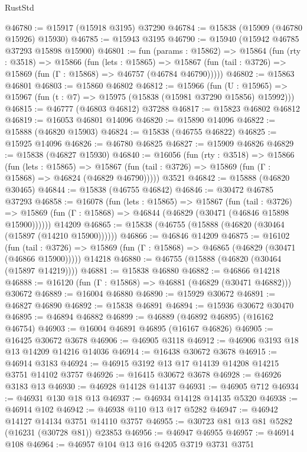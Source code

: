 \begin{lexlean}{RustStd}
\begin{coremodule}
@46780 := @15917 (@15918 @3195) @37290
@46784 := @15838 (@15909 (@46780 @15926) @15930)
@46785 := @15943 @3195
@46790 := @15940 (@15942 @46785 @37293 @15898 @15900)
@46801 := fun (params : @15862) =>
  @15864
    (fun (rty : @3518) =>
    @15866
      (fun (lets : @15865) =>
      @15867 (fun (tail : @3726) => @15869 (fun (Γ : @15868) => @46757 (@46784 @46790)))))
@46802 := @15863 @46801
@46803 := @15860 @46802
@46812 := @15966
    (fun (U : @15965) => @15967 (fun (t : @7) => @15975 (@15838 (@15981 @37290 @15856) @15992)))
@46815 := @46777 (@46803 @46812) @37288
@46817 := @15823 @46802 @46812
@46819 := @16053 @46801 @14096
@46820 := @15890 @14096
@46822 := @15888 (@46820 @15903)
@46824 := @15838 (@46755 @46822)
@46825 := @15925 @14096
@46826 := @46780 @46825
@46827 := @15909 @46826
@46829 := @15838 (@46827 @15930)
@46840 := @16056
    (fun (rty : @3518) =>
    @15866
      (fun (lets : @15865) =>
      @15867 (fun (tail : @3726) => @15869 (fun (Γ : @15868) => @46824 (@46829 @46790)))))
    @3521
@46842 := @15888 (@46820 @30465)
@46844 := @15838 (@46755 @46842)
@46846 := @30472 @46785 @37293
@46858 := @16078
    (fun (lets : @15865) =>
    @15867
      (fun (tail : @3726) =>
      @15869 (fun (Γ : @15868) => @46844 (@46829 (@30471 (@46846 @15898 @15900))))))
    @14209
@46865 := @15838 (@46755 (@15888 (@46820 (@30464 (@15897 (@14210 @15900))))))
@46866 := @46846 @14209
@46875 := @16102
    (fun (tail : @3726) => @15869 (fun (Γ : @15868) => @46865 (@46829 (@30471 (@46866 @15900)))))
    @14218
@46880 := @46755 (@15888 (@46820 (@30464 (@15897 @14219))))
@46881 := @15838 @46880
@46882 := @46866 @14218
@46888 := @16120 (fun (Γ : @15868) => @46881 (@46829 (@30471 @46882))) @30672
@46889 := @16004 @46880
@46890 := @15929 @30672
@46891 := @46827 @46890
@46892 := @15838 @46891
@46894 := @15936 @30672 @30470
@46895 := @46894 @46882
@46899 := @46889 (@46892 @46895) (@16162 @46754)
@46903 := @16004 @46891 @46895 (@16167 @46826)
@46905 := @16425 @30672 @3678
@46906 := @46905 @3118
@46912 := @46906 @3193 @18 @13 @14209 @14216 @14036
@46914 := @16438 @30672 @3678
@46915 := @46914 @3183
@46924 := @46915 @3192 @13 @17 @14139 @14208 @14215 @3751 @14102 @3757
@46926 := @16415 @30672 @3678
@46928 := @46926 @3183 @13
@46930 := @46928 @14128 @14137
@46931 := @46905 @712
@46934 := @46931 @130 @18 @13
@46937 := @46934 @14128 @14135 @5320
@46938 := @46914 @102
@46942 := @46938 @110 @13 @17 @5282
@46947 := @46942 @14127 @14134 @3751 @14110 @3757
@46955 := @30723 @81 @13 @81 @5282 (@16231 (@30728 @81)) @23853
@46956 := @46947 @46955
@46957 := @46914 @108
@46964 := @46957 @104 @13 @16 @4205 @3719 @3731 @3751

\end{coremodule}
\end{lexlean}

